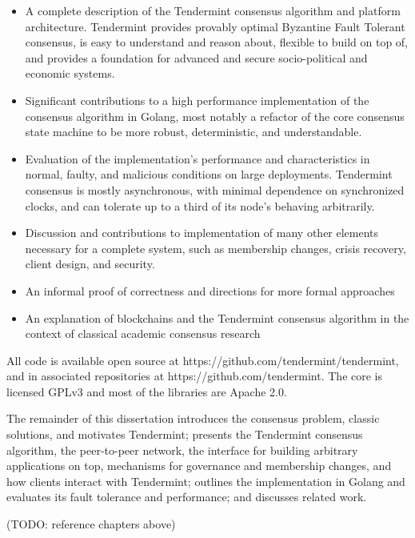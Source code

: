 \begin{itemize}  

    \item A complete description of the Tendermint consensus algorithm and platform architecture. Tendermint provides provably optimal Byzantine Fault Tolerant consensus, is easy to understand and reason about, flexible to build on top of, and provides a foundation for advanced and secure socio-political and economic systems. 

    \item Significant contributions to a high performance implementation of the consensus algorithm in Golang, most notably a refactor of the core consensus state machine to be more robust, deterministic, and understandable.

    \item Evaluation of the implementation's performance and characteristics in normal, faulty, and malicious conditions on large deployments. Tendermint consensus is mostly asynchronous, with minimal dependence on synchronized clocks, and can tolerate up to a third of its node's behaving arbitrarily. 

    \item Discussion and contributions to implementation of many other elements necessary for a complete system, such as membership changes, crisis recovery, client design, and security.

    \item An informal proof of correctness and directions for more formal approaches

    \item An explanation of blockchains and the Tendermint consensus algorithm in the context of classical academic consensus research 
\end{itemize}

All code is available open source at https://github.com/tendermint/tendermint, and in associated repositories at https://github.com/tendermint. 
The core is licensed GPLv3 and most of the libraries are Apache 2.0.

The remainder of this dissertation introduces the consensus problem, classic solutions, and motivates Tendermint;
presents the Tendermint consensus algorithm, the peer-to-peer network, the interface for building arbitrary applications on top,  
mechanisms for governance and membership changes, and how clients interact with Tendermint;
outlines the implementation in Golang and evaluates its fault tolerance and performance;
and discusses related work.

(TODO: reference chapters above)
